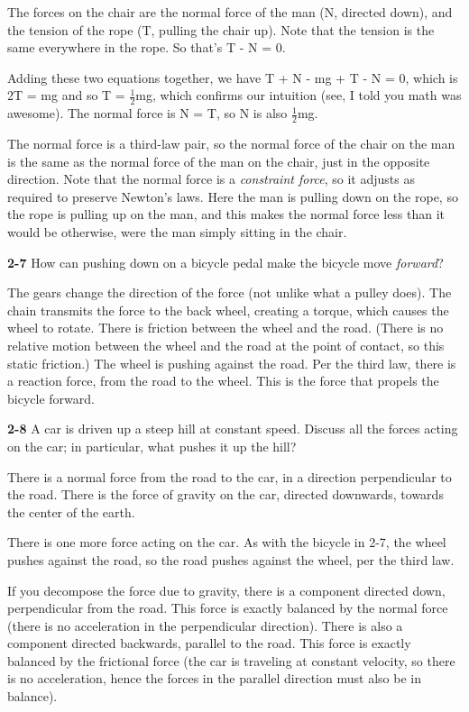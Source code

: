 \documentclass{amsart}
\begin{document}
The forces on the chair are the normal force of the man (N, directed down), and the tension
of the rope (T, pulling the chair up).
Note that the tension is the same everywhere in the rope.  So that's T - N = 0.

Adding these two equations together, we have T + N - mg + T - N = 0, which is 2T = mg and so T = $\frac{1}{2}$mg,
which confirms our intuition (see, I told you math was awesome).  The normal force is N = T, so N is also $\frac{1}{2}$mg.

The normal force is a third-law pair, so the normal force of the chair on the man is the same as the normal force
of the man on the chair, just in the opposite direction.  Note that the normal force is a \textit{constraint force},
so it adjusts as required to preserve Newton's laws.
Here the man is pulling down on the rope, so the rope is pulling up on the man, and this makes the normal force less
than it would be otherwise, were the man simply sitting in the chair.

\vspace{\baselineskip}

\noindent
\textbf{2-7} How can pushing down on a bicycle pedal make the bicycle move \textit{forward}?

The gears change the direction of the force (not unlike what a pulley does).
The chain transmits the force to the back wheel, creating a torque, which causes the wheel to rotate.
There is friction between the wheel and the road.
(There is no relative motion between the wheel and the road at the point of contact, so this static friction.)
The wheel is pushing against the road.
Per the third law, there is a reaction force, from the road to the wheel.
This is the force that propels the bicycle forward.

\vspace{\baselineskip}

\noindent
\textbf{2-8} A car is driven up a steep hill at constant speed.
Discuss all the forces acting on the car; in particular, what pushes it up the hill?

There is a normal force from the road to the car, in a direction perpendicular to the road.
There is the force of gravity on the car, directed downwards, towards the center of the earth.

There is one more force acting on the car.
As with the bicycle in 2-7, the wheel pushes against the road, so the road pushes against the wheel, per the third law.

If you decompose the force due to gravity, there is a component directed down, perpendicular from the road.
This force is exactly balanced by the normal force (there is no acceleration in the perpendicular direction).
There is also a component directed backwards, parallel to the road.  This force is exactly balanced by the frictional force
(the car is traveling at constant velocity, so there is no acceleration, hence the forces in the parallel direction must also be in balance).
\end{document}
